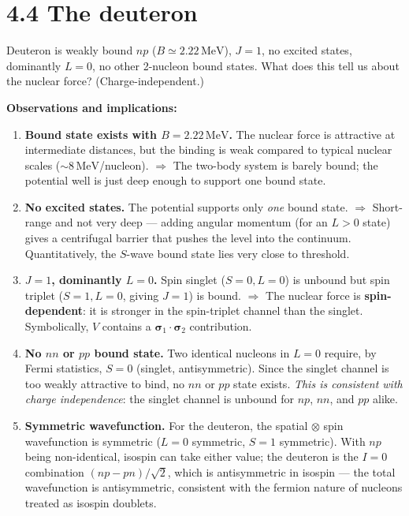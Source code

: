 \documentclass[11pt]{article}
\newcommand{\Q}[1]{\begin{question}#1\end{question}}
\newcommand{\MeV}{\,\mathrm{MeV}}
\begin{document}
\section*{4.4 \quad The deuteron}

\Q{Deuteron is weakly bound $np$ ($B\simeq 2.22\MeV$), $J=1$, no excited states, dominantly $L=0$, no other 2-nucleon bound states. What does this tell us about the nuclear force? (Charge-independent.)}

\textbf{Observations and implications:}

\begin{enumerate}[itemsep=2pt]
\item \textbf{Bound state exists with $B=2.22\MeV$.} The nuclear force is attractive at intermediate distances, but the binding is weak compared to typical nuclear scales ($\sim 8\MeV$/nucleon). $\Rightarrow$ The two-body system is barely bound; the potential well is just deep enough to support one bound state.
\item \textbf{No excited states.} The potential supports only \emph{one} bound state. $\Rightarrow$ Short-range and not very deep --- adding angular momentum (for an $L>0$ state) gives a centrifugal barrier that pushes the level into the continuum. Quantitatively, the $S$-wave bound state lies very close to threshold.
\item \textbf{$J=1$, dominantly $L=0$.} Spin singlet ($S=0,L=0$) is unbound but spin triplet ($S=1,L=0$, giving $J=1$) is bound. $\Rightarrow$ The nuclear force is \textbf{spin-dependent}: it is stronger in the spin-triplet channel than the singlet. Symbolically, $V$ contains a $\boldsymbol{\sigma}_1\!\cdot\!\boldsymbol{\sigma}_2$ contribution.
\item \textbf{No $nn$ or $pp$ bound state.} Two identical nucleons in $L=0$ require, by Fermi statistics, $S=0$ (singlet, antisymmetric). Since the singlet channel is too weakly attractive to bind, no $nn$ or $pp$ state exists. \emph{This is consistent with charge independence}: the singlet channel is unbound for $np$, $nn$, and $pp$ alike.
\item \textbf{Symmetric wavefunction.} For the deuteron, the spatial $\otimes$ spin wavefunction is symmetric ($L=0$ symmetric, $S=1$ symmetric). With $np$ being non-identical, isospin can take either value; the deuteron is the $I=0$ combination $(np-pn)/\sqrt{2}$, which is antisymmetric in isospin --- the total wavefunction is antisymmetric, consistent with the fermion nature of nucleons treated as isospin doublets.
\end{enumerate}
\end{document}
